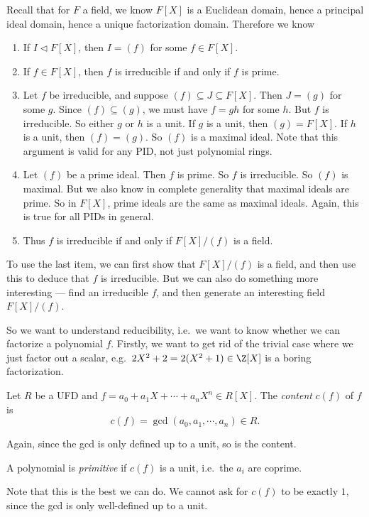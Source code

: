 \documentclass[a4paper]{article}
\begin{document}
Recall that for $F$ a field, we know $F[X]$ is a Euclidean domain, hence a principal ideal domain, hence a unique factorization domain. Therefore we know
\begin{enumerate}
  \item If $I \lhd F[X]$, then $I = (f)$ for some $f \in F[X]$.
  \item If $f \in F[X]$, then $f$ is irreducible if and only if $f$ is prime.
  \item Let $f$ be irreducible, and suppose $(f) \subseteq J \subseteq F[X]$. Then $J = (g)$ for some $g$. Since $(f) \subseteq (g)$, we must have $f = gh$ for some $h$. But $f$ is irreducible. So either $g$ or $h$ is a unit. If $g$ is a unit, then $(g) = F[X]$. If $h$ is a unit, then $(f) = (g)$. So $(f)$ is a maximal ideal. Note that this argument is valid for any PID, not just polynomial rings.
  \item Let $(f)$ be a prime ideal. Then $f$ is prime. So $f$ is irreducible. So $(f)$ is maximal. But we also know in complete generality that maximal ideals are prime. So in $F[X]$, prime ideals are the same as maximal ideals. Again, this is true for all PIDs in general.
  \item Thus $f$ is irreducible if and only if $F[X]/(f)$ is a field.
\end{enumerate}
To use the last item, we can first show that $F[X]/(f)$ is a field, and then use this to deduce that $f$ is irreducible. But we can also do something more interesting --- find an irreducible $f$, and then generate an interesting field $F[X]/(f)$.

So we want to understand reducibility, i.e.\ we want to know whether we can factorize a polynomial $f$. Firstly, we want to get rid of the trivial case where we just factor out a scalar, e.g.\ $2X^2 + 2 = 2(X^2 + 1) \in \Z[X]$ is a boring factorization.

\begin{defi}[Content]
  Let $R$ be a UFD and $f = a_0 + a_1 X + \cdots + a_n X^n \in R[X]$. The \emph{content} $c(f)$ of $f$ is
  \[
    c(f) = \gcd(a_0, a_1, \cdots, a_n) \in R.
  \]
\end{defi}
Again, since the gcd is only defined up to a unit, so is the content.

\begin{defi}
  A polynomial is \emph{primitive} if $c(f)$ is a unit, i.e.\ the $a_i$ are coprime.
\end{defi}
Note that this is the best we can do. We cannot ask for $c(f)$ to be exactly $1$, since the gcd is only well-defined up to a unit.
\end{document}
